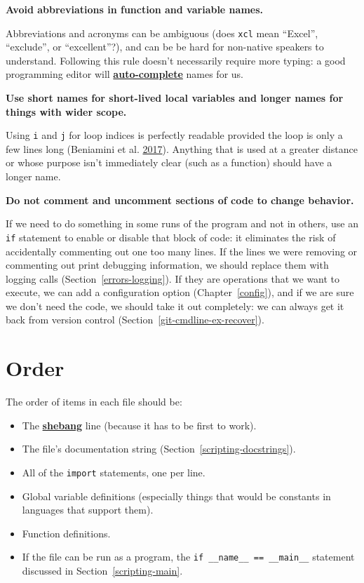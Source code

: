 \documentclass[
]{krantz}
\providecommand{\tightlist}{%
  \setlength{\itemsep}{0pt}\setlength{\parskip}{0pt}}
\newcommand{\gref}[2]{\hyperlink{#2}{\textbf{#1}}}
\begin{document}
\textbf{Avoid abbreviations in function and variable names.}

Abbreviations and acronyms can be ambiguous
(does \texttt{xcl} mean ``Excel'', ``exclude'', or ``excellent''?),
and can be be hard for non-native speakers to understand.
Following this rule doesn't necessarily require more typing:
a good programming editor will \gref{auto-complete}{auto\_completion} names for us.

\textbf{Use short names for short-lived local variables and longer names for things with wider scope.}

Using \texttt{i} and \texttt{j} for loop indices is perfectly readable
provided the loop is only a few lines long (Beniamini et al. \protect\hyperlink{ref-Beni2017}{2017}).
Anything that is used at a greater distance
or whose purpose isn't immediately clear
(such as a function) should have a longer name.

\textbf{Do not comment and uncomment sections of code to change behavior.}

If we need to do something in some runs of the program and not in others,
use an \texttt{if} statement to enable or disable that block of code:
it eliminates the risk of accidentally commenting out one too many lines.
If the lines we were removing or commenting out print debugging information,
we should replace them with logging calls (Section~\ref{errors-logging}).
If they are operations that we want to execute,
we can add a configuration option (Chapter~\ref{config}),
and if we are sure we don't need the code,
we should take it out completely:
we can always get it back from version control
(Section~\ref{git-cmdline-ex-recover}).

\hypertarget{style-order}{%
\section{Order}\label{style-order}}

The order of items in each file should be:

\begin{itemize}
\tightlist
\item
  The \gref{shebang}{shebang} line (because it has to be first to work).
\item
  The file's documentation string (Section~\ref{scripting-docstrings}).
\item
  All of the \texttt{import} statements, one per line.
\item
  Global variable definitions
  (especially things that would be constants in languages that support them).
\item
  Function definitions.
\item
  If the file can be run as a program,
  the \texttt{if\ \_\_name\_\_\ ==\ \textquotesingle{}\_\_main\_\_\textquotesingle{}} statement discussed in
  Section~\ref{scripting-main}.
\end{itemize}
\end{document}
